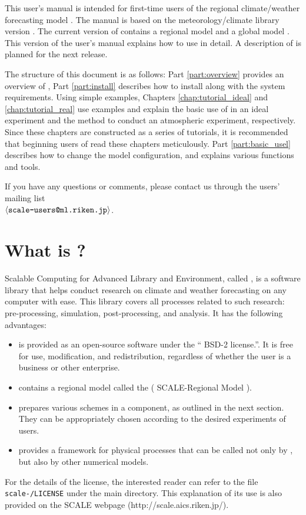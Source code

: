 
This user's manual is intended for first-time users
of the regional climate/weather forecasting model \scalerm.
The manual is based on
the meteorology/climate library {\scalelib} version \version.
The current version of \scalelib contains a regional model \scalerm
and a global model \scalegm.
This version of the user's manual explains how to use \scalerm in detail.
A description of \scalegm is planned for the next release.

The structure of this document is as follows:
Part \ref{part:overview} provides an overview of \scalelib,
Part \ref{part:install} describes how to install \scalerm
along with the system requirements. Using simple examples,
Chapters \ref{chap:tutorial_ideal} and \ref{chap:tutorial_real} use examples and explain the basic use of \scalerm in an ideal experiment and the method
to conduct an atmospheric experiment, respectively. Since these chapters are constructed as a series of tutorials, it is recommended that beginning users of \scalerm read these chapters meticulously.
Part \ref{part:basic_usel} describes how to change the model configuration, and explains various functions and tools.

If you have any questions or comments, please contact us through the users’ mailing list\\ $\langle \verb|scale-users@ml.riken.jp|\rangle$.


\section{What is \scalelib?} \label{subsec:scale_feature}

Scalable Computing for Advanced Library and Environment, called {\scalelib}, is a software library that helps conduct research on climate and weather forecasting on any computer with ease. 
This library covers all processes related to such research: 
pre-processing, simulation, post-processing, and analysis. 
It has the following advantages:
\begin{itemize}
\item 
\scalelib is provided as an open-source software under the `` BSD-2 license.''. It is free for use, modification, and redistribution, regardless of whether the user is a business or other enterprise.
\item 
\scalelib contains a regional model called the \scalerm ( SCALE-Regional Model ).
\item 
\scalelib prepares various schemes in a component, as outlined in the next section. They can be appropriately chosen according to the desired experiments of users.
\item 
\scalelib provides a framework for physical processes that can be called not only by \scalerm, but also by other numerical models.
\end{itemize}
For the details of the license, the interested reader can refer to the file \texttt{scale-\version/LICENSE} under the main directory. This explanation of its use is also provided on the SCALE webpage (http://scale.aics.riken.jp/). 

